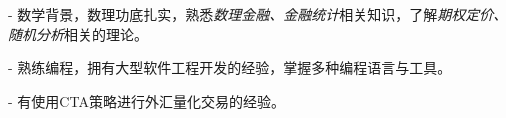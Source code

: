 - 数学背景，数理功底扎实，熟悉\textit{数理金融、金融统计}相关知识，了解\textit{期权定价、随机分析}相关的理论。

- 熟练编程，拥有大型软件工程开发的经验，掌握多种编程语言与工具。

- 有使用CTA策略进行外汇量化交易的经验。

\endinput
